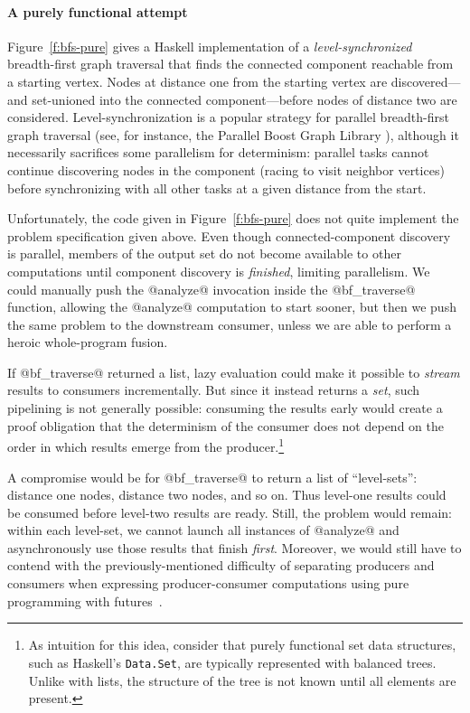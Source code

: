 \paragraph{A purely functional attempt}

Figure~\ref{f:bfs-pure} gives a Haskell implementation of a
\emph{level-synchronized} breadth-first graph traversal that finds the
connected component reachable from a starting vertex.  Nodes at
distance one from the starting vertex are discovered---and set-unioned
into the connected component---before nodes of distance two are
considered.  Level-synchronization is a popular strategy for parallel
breadth-first graph traversal (see, for instance, the Parallel Boost
Graph Library \cite{bfs-pbgl}), although it necessarily sacrifices
some parallelism for determinism: parallel tasks cannot continue
discovering nodes in the component (racing to visit neighbor vertices)
before synchronizing with all other tasks at a given distance from the
start.

Unfortunately, the code given in Figure~\ref{f:bfs-pure} does not
quite implement the problem specification given above.  Even though
connected-component discovery is parallel, members of the output set
do not become available to other computations until component
discovery is \emph{finished}, limiting parallelism.  We could manually
push the @analyze@ invocation inside the @bf_traverse@ function,
allowing the @analyze@ computation to start sooner, but then we push
the same problem to the downstream consumer, unless we are able to
perform a heroic whole-program fusion.  

If @bf_traverse@ returned a list, lazy evaluation could make it
possible to \emph{stream} results to consumers incrementally.  But
since it instead returns a \emph{set}, such pipelining is not
generally possible: consuming the results early would create a proof
obligation that the determinism of the consumer does not depend on the
order in which results emerge from the producer.\footnote{As intuition
  for this idea, consider that purely functional set data structures,
  such as Haskell's \lstinline|Data.Set|, are typically represented
  with balanced trees.  Unlike with lists, the structure of the tree
  is not known until all elements are present.}

A compromise would be for @bf_traverse@ to return a list of
``level-sets'': distance one nodes, distance two nodes, and so on.
Thus level-one results could be consumed before level-two results are
ready.  Still, the problem would remain: within each level-set, we
cannot launch all instances of @analyze@ and asynchronously use those
results that finish \emph{first}.  Moreover, we would still have to
contend with the previously-mentioned difficulty of separating
producers and consumers when expressing producer-consumer computations
using pure programming with futures~\cite{monad-par}.


